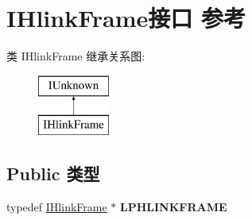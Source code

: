 \hypertarget{interface_i_hlink_frame}{}\section{I\+Hlink\+Frame接口 参考}
\label{interface_i_hlink_frame}
类 I\+Hlink\+Frame 继承关系图\+:\begin{figure}[H]
\begin{center}
\leavevmode
\includegraphics[height=2.000000cm]{interface_i_hlink_frame}
\end{center}
\end{figure}
\subsection*{Public 类型}
\begin{DoxyCompactItemize}
\item 
\mbox{\label{interface_i_hlink_frame_aac04b2db941e7d57cdb0ddc1932f1a91}} 
typedef \hyperlink{interface_i_hlink_frame}{I\+Hlink\+Frame} $\ast$ {\bfseries L\+P\+H\+L\+I\+N\+K\+F\+R\+A\+ME}
\end{DoxyCompactItemize}
